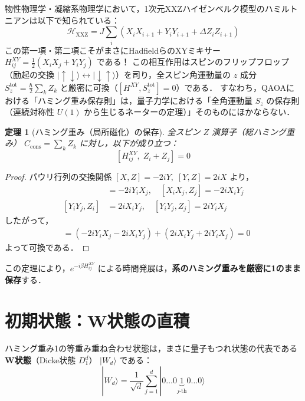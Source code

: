 \documentclass[11pt,a4paper,oneside,openany]{ltjsbook}
\theoremstyle{definition}
\theoremstyle{plain}
\newtheorem{theorem}{定理}[chapter]
\theoremstyle{remark}
\newcommand{\ket}[1]{|#1\rangle}
\begin{document}
\begin{insightbox}
物性物理学・凝縮系物理学において，1次元XXZハイゼンベルク模型のハミルトニアンは以下で知られている：
\begin{equation}
    \mathcal{H}_{\text{XXZ}} = J \sum_{i} \left( X_i X_{i+1} + Y_i Y_{i+1} + \Delta Z_i Z_{i+1} \right)
\end{equation}
この第一項・第二項こそがまさにHadfieldらのXYミキサー $H_{ij}^{XY} = \frac{1}{2}(X_i X_j + Y_i Y_j)$ である！
この相互作用はスピンのフリップフロップ（励起の交換 $\ket{\uparrow\downarrow} \leftrightarrow \ket{\downarrow\uparrow}$）を司り，全スピン角運動量の $z$ 成分 $S_z^{\text{tot}} = \frac{\hbar}{2}\sum_k Z_k$ と厳密に可換（$[H^{XY}, S_z^{\text{tot}}] = 0$）である．
すなわち，QAOAにおける「ハミング重み保存則」は，量子力学における「全角運動量 $S_z$ の保存則（連続対称性 $U(1)$ から生じるネーターの定理）」そのものにほかならない．
\end{insightbox}

\begin{theorem}[ハミング重み（局所磁化）の保存]
全スピン $Z$ 演算子（総ハミング重み） $C_{\text{cons}} = \sum_k Z_k$ に対し，以下が成り立つ：
\begin{equation}
    \left[ H_{ij}^{XY}, \; Z_i + Z_j \right] = 0
\end{equation}
\end{theorem}
\begin{proof}
パウリ行列の交換関係 $[X, Z] = -2iY, \; [Y, Z] = 2iX$ より，
\begin{align*}
    [X_i X_j, Z_i] &= -2i Y_i X_j, \quad [X_i X_j, Z_j] = -2i X_i Y_j \\
    [Y_i Y_j, Z_i] &= 2i X_i Y_j, \quad [Y_i Y_j, Z_j] = 2i Y_i X_j
\end{align*}
したがって，
\begin{align*}
    [X_i X_j + Y_i Y_j, \; Z_i + Z_j] &= (-2i Y_i X_j - 2i X_i Y_j) + (2i X_i Y_j + 2i Y_i X_j) = 0
\end{align*}
よって可換である．
\end{proof}

この定理により，$e^{-i \beta H_{ij}^{XY}}$ による時間発展は，\textbf{系のハミング重みを厳密に1のまま保存}する．

\section{初期状態：W状態の直積}
ハミング重み1の等重み重ね合わせ状態は，まさに量子もつれ状態の代表である \textbf{W状態}（Dicke状態 $D_1^d$） $\ket{W_d}$ である\cite{hadfield2019from,bartschi2019deterministic}：
\begin{equation}
    \ket{W_d} = \frac{1}{\sqrt{d}} \sum_{j=1}^d \ket{0 \dots 0 \underbrace{1}_{j\text{-th}} 0 \dots 0}
\end{equation}
\end{document}
